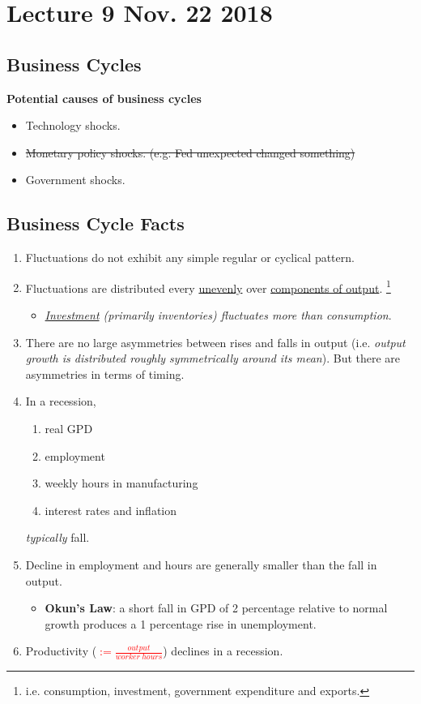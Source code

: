 \documentclass[11pt]{article}
\begin{document}
	\section{Lecture 9 Nov. 22 2018}
		\subsection*{Business Cycles}
			\par \textbf{Potential causes of business cycles}
			\begin{itemize}
				\item Technology shocks.
				\item \st{Monetary policy shocks. (e.g. Fed unexpected changed something)}
				\item Government shocks.
			\end{itemize}
		\subsection{Business Cycle Facts}
			\begin{enumerate}
				\item Fluctuations do not exhibit any simple regular or cyclical pattern.
				\item Fluctuations are distributed every \ul{unevenly} over \ul{components of output}. \footnote{i.e. consumption, investment, government expenditure and exports.} \begin{itemize}
						\item \emph{\ul{Investment} (primarily inventories) fluctuates more than consumption}.	
 						\end{itemize}
				\item There are no large asymmetries between rises and falls in output (i.e. \emph{output growth is distributed roughly symmetrically around its mean}). But there are asymmetries in terms of timing.
				\item In a recession,
					\begin{enumerate}
						\item real GPD
						\item employment
						\item weekly hours in manufacturing
						\item interest rates and inflation		
					\end{enumerate} \emph{typically} fall.
				\item Decline in employment and hours are generally smaller than the fall in output.
					\begin{itemize}
						\item \textbf{Okun's Law}: a short fall in GPD of 2 percentage relative to normal growth produces a 1 percentage rise in unemployment.
					\end{itemize}
				\item Productivity (\textcolor{red}{$:=\frac{output}{worker\ hours}$}) declines in a recession.
			\end{enumerate}
			
\end{document}
